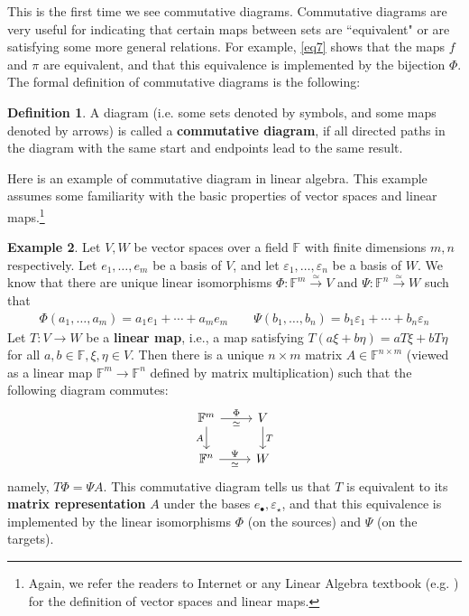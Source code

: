 \documentclass[12pt,b5paper,notitlepage]{article}
\theoremstyle{definition}
\newtheorem{df}{Definition}[section]
\newtheorem{eg}[df]{Example}
\theoremstyle{plain}
\newcommand{\blt}{\bullet}
\newcommand{\Fbb}{\mathbb F}
\newcommand{\eps}{\varepsilon}
\numberwithin{equation}{section}
\begin{document}
This is the first time we see commutative diagrams. Commutative diagrams are very useful for indicating that certain maps between sets are ``equivalent" or are satisfying some more general relations. For example, \eqref{eq7} shows that the maps $f$ and $\pi$ are equivalent, and that this equivalence is implemented by the bijection $\Phi$. The formal definition of commutative diagrams is the following:


\begin{df}
A diagram (i.e. some sets denoted by symbols, and some maps denoted by arrows) is called a \textbf{commutative diagram},  if all directed paths in the diagram with the same start and endpoints lead to the same result.
\end{df}


Here is an example of commutative diagram in linear algebra. This example assumes some familiarity with the basic properties of vector spaces  and linear maps.\footnote{Again, we refer the readers to Internet or any Linear Algebra textbook (e.g. \cite{Axl}) for the definition of vector spaces and linear maps.}


\begin{eg}\label{lb67}
Let $V,W$ be vector spaces over a field $\Fbb$ with finite dimensions $m,n$ respectively. Let $e_1,\dots,e_m$ be a basis of $V$, and let $\eps_1,\dots,\eps_n$ be a basis of $W$. We know that there are unique linear isomorphisms $\Phi:\Fbb^m\xrightarrow{\simeq} V$ and $\Psi:\Fbb^n\xrightarrow{\simeq} W$ such that
\begin{align*}
\Phi(a_1,\dots,a_m)=a_1e_1+\cdots+a_me_m\qquad \Psi(b_1,\dots,b_n)=b_1\eps_1+\cdots+b_n\eps_n
\end{align*}
Let $T:V\rightarrow W$ be a  \textbf{linear map}, i.e., a map satisfying $T(a\xi+b\eta)=aT\xi+bT\eta$ for all $a,b\in\Fbb,\xi,\eta\in V$. Then there is a unique $n\times m$ matrix $A\in\Fbb^{n\times m}$ \index{Fnm@$\Fbb^{n\times m}$, the set of $n\times m$ matrices} (viewed as a linear map $\Fbb^m\rightarrow\Fbb^n$ defined by matrix multiplication) such that the following diagram commutes:
\begin{equation}
\begin{tikzcd}
\Fbb^m \arrow[r,"\Phi","\simeq"'] \arrow[d,"A"'] & V \arrow[d,"T"] \\
\Fbb^n \arrow[r,"\Psi","\simeq"']           & W          
\end{tikzcd}
\end{equation} 
namely, $T\Phi=\Psi A$. This commutative diagram tells us that $T$ is equivalent to its \textbf{matrix representation}  $A$ under the bases $e_\blt,\eps_\star$, and that this equivalence is implemented by the linear isomorphisms $\Phi$ (on the sources) and $\Psi$ (on the targets). 
\end{eg}
\end{document}
